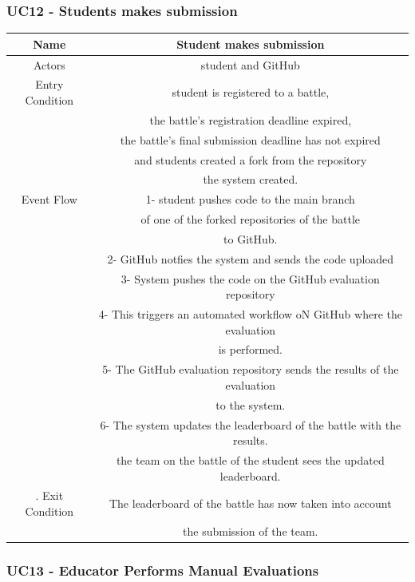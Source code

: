 \documentclass{article}
\begin{document}
\subsubsection*{UC12 - Students makes submission}

\begin{tabular*}{\linewidth}{@{\extracolsep{\fill}} cc }
    \hline
    Name & Student makes submission \\ 
    \hline
    Actors & student and GitHub\\ 
    \hline
    Entry Condition & student is registered to a battle,\\
                    & the battle's registration deadline expired,\\
                    & the battle's final submission deadline has not expired\\
                    & and students created a fork from the repository \\
                    & the system created.\\
    \hline
    Event Flow & 1- student pushes code to the main branch\\
               & of one of the forked repositories of the battle\\
               & to GitHub.\\
               & 2- GitHub notfies the system and sends the code uploaded\\
               & 3- System pushes the code on the GitHub evaluation repository\\
               & 4- This triggers an automated workflow oN GitHub where the evaluation\\
               & is performed.\\
               & 5- The GitHub evaluation repository sends the results of the evaluation\\
               & to the system.\\
               & 6- The system updates the leaderboard of the battle with the results.\\
               & the team on the battle of the student sees the updated leaderboard.\\
    \hline.
    Exit Condition & The leaderboard of the battle has now taken into account\\
                   & the submission of the team.\\
    \hline
\end{tabular*}

\subsubsection*{UC13 - Educator Performs Manual Evaluations}
\end{document}
